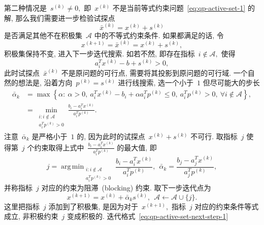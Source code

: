 \documentclass{SBCbookchapter}
\DeclareMathOperator*{\argmin}{arg\,min}
\numberwithin{equation}{section}
\begin{document}
第二种情况是~${s}^{(k)} \neq {0},$ 即~${x}^{(k)}$ 不是当前等式约束问题~\eqref{eq:qp-active-set-1} 的解, 那么我们需要进一步检验试探点
\begin{equation}
\label{eq:qp-active-set-test-point}
\bar{{x}}^{(k)} = {x}^{(k)} + {s}^{(k)}
\end{equation}
是否满足其他不在积极集~$\mathcal{A}$ 中的不等式约束条件. 如果都满足的话, 令
\begin{equation}
\label{eq:qp-active-set-next-step-1}
{x}^{(k+1)} = \bar{{x}}^{(k)} = {x}^{(k)} + {s}^{(k)},
\end{equation}
积极集保持不变, 进入下一步迭代搜索. 如若不然, 即存在指标~$i \not\in \mathcal{A},$ 使得
\begin{equation*}
{a}_i^T {x}^{(k)} - {b} + {s}^{(k)} > 0,
\end{equation*}
此时试探点~$\bar{{x}}^{(k)}$ 不是原问题的可行点, 需要将其投影到原问题的可行域.
一个自然的想法是, 沿着方向~${p}^{(k)} = {s}^{(k)}$ 进行线搜索, 选一个小于~$1$ 但尽可能大的步长
\begin{equation}
\label{eq:qp-active-set-step-len-1}
\begin{aligned}
\bar{\alpha}_k & = \max \left\{ \alpha : ~ \alpha > 0, ~ {a}_i^T {x}^{(k)} - b_i + \alpha {a}_i^T {p}^{(k)} \leqslant 0, ~ {a}_i^T {p}^{(k)} > 0, ~ \forall i \not\in \mathcal{A} \right\}, \\
& = \min_{\substack{i: i \not\in \mathcal{A} \\ {a}_i^T {p}^{(k)} > 0}} \frac{b_i - {a}_i^T {x}^{(k)}}{{a}_i^T {p}^{(k)}}.
\end{aligned}
\end{equation}
注意~$\bar{\alpha}_k$ 是严格小于~$1$ 的, 因为此时的试探点~${x}^{(k)} + {s}^{(k)}$ 不可行. 取指标~$j$ 使得第~$j$ 个约束取得上式中~$\frac{b_i - {a}_i^T {x}^{(k)}}{{a}_i^T {p}^{(k)}}$ 的最大值, 即
\begin{equation}
\label{eq:qp-active-set-step-len-2}
j = \argmin_{\substack{i: i \not\in \mathcal{A} \\ {a}_i^T {p}^{(k)} > 0}} \frac{b_i - {a}_i^T {x}^{(k)}}{{a}_i^T {p}^{(k)}}, ~~ \bar{\alpha}_k = \frac{b_j - {a}_j^T {x}^{(k)}}{{a}_j^T {p}^{(k)}},
\end{equation}
并称指标~$j$ 对应的约束为阻滞~(blocking) 约束. 取下一步迭代点为
\begin{equation}
\label{eq:qp-active-set-next-step-2}
{x}^{(k+1)} = {x}^{(k)} + \bar{\alpha}_k {s}^{(k)}, ~~ \mathcal{A} \gets \mathcal{A} \cup \{ j \}.
\end{equation}
这里把指标~$j$ 添加到了积极集, 是因为对于~${x}^{(k+1)},$ 指标~$j$ 对应的约束条件等式成立, 非积极约束~$j$ 变成积极的. 迭代格式~\eqref{eq:qp-active-set-next-step-1}
\end{document}
